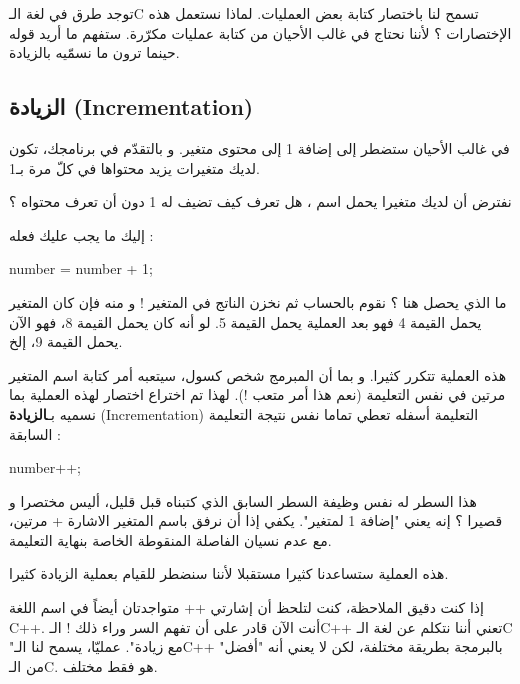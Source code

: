 توجد طرق في لغة الـ\textenglish{C}
تسمح لنا باختصار كتابة بعض العمليات. لماذا نستعمل هذه الإختصارات ؟ لأننا نحتاج في غالب الأحيان من كتابة عمليات مكرّرة. ستفهم ما أريد قوله حينما ترون ما نسمّيه بالزيادة.

\subsection{الزيادة (\textenglish{Incrementation})}

في غالب الأحيان ستضطر إلى إضافة 1 إلى محتوى متغير. و بالتقدّم في برنامجك، تكون لديك متغيرات يزيد محتواها في كلّ مرة بـ1.

نفترض أن لديك متغيرا يحمل اسم
،
هل تعرف كيف تضيف له 1 دون أن تعرف محتواه ؟

إليك ما يجب عليك فعله :

\begin{Csource}
number = number + 1;
\end{Csource}

ما الذي يحصل هنا ؟ نقوم بالحساب
ثم نخزن الناتج في المتغير
 !
و منه فإن كان المتغير يحمل القيمة 4 فهو بعد العملية يحمل القيمة 5. لو أنه كان يحمل القيمة 8، فهو الآن يحمل القيمة 9، إلخ.

هذه العملية تتكرر كثيرا. و بما أن المبرمج شخص كسول، سيتعبه أمر كتابة اسم المتغير مرتين في نفس التعليمة (نعم هذا أمر متعب !). لهذا تم اختراع اختصار لهذه العملية بما نسميه بـ\textbf{الزيادة }
(\textenglish{Incrementation})
التعليمة أسفله تعطي تماما نفس نتيجة التعليمة السابقة :

\begin{Csource}
  number++;
\end{Csource}

هذا السطر له نفس وظيفة السطر السابق الذي كتبناه قبل قليل، أليس مختصرا و قصيرا ؟ إنه يعني "إضافة 1 لمتغير". يكفي إذا أن نرفق باسم المتغير
الاشارة + مرتين، مع عدم نسيان الفاصلة المنقوطة الخاصة بنهاية التعليمة.

هذه العملية ستساعدنا كثيرا مستقبلا لأننا سنضطر للقيام بعملية الزيادة كثيرا.

\begin{information}
إذا كنت دقيق الملاحظة، كنت لتلحظ أن إشارتي
++
متواجدتان أيضاً في اسم اللغة
\textenglish{C++}.
أنت الآن قادر على أن تفهم السر وراء ذلك ! الـ\textenglish{C++}
تعني أننا نتكلم عن لغة الـ\textenglish{C}
"مع زيادة". عمليّا، يسمح لنا الـ\textenglish{C++}
بالبرمجة بطريقة مختلفة، لكن لا يعني أنه "أفضل" من الـ\textenglish{C}.
هو فقط مختلف.
\end{information}

